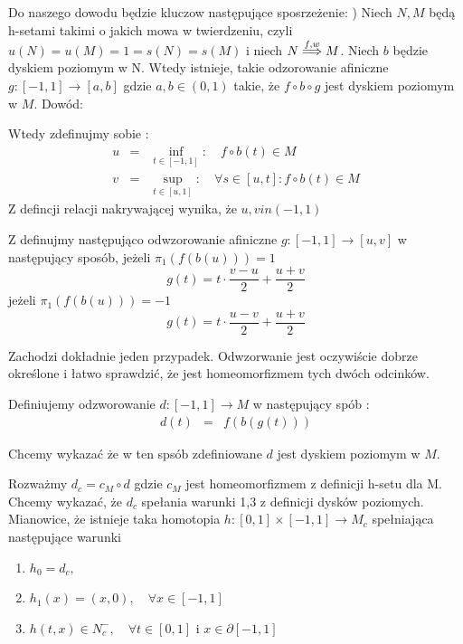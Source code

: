 Do naszego dowodu będzie kluczow następujące sposrzeżenie:
) Niech $N,M$ będą h-setami takimi o jakich mowa w twierdzeniu, czyli $ u(N)=u(M) = 1 = s(N) = s(M) $
i niech $ N \stackrel{f,w}{\Longrightarrow} M$. Niech $b$ będzie dyskiem poziomym w N.
Wtedy istnieje, takie odzorowanie afiniczne $ g:[-1,1] \to [a,b] $ gdzie $ a,b  \in (0,1) $ 
takie, że $ f \circ b \circ g $ jest dyskiem poziomym w $M$.
Dowód:

Wtedy zdefinujmy sobie :
\begin{eqnarray*}
  		u &=& \inf_{ t \in [-1,1]} : \quad f \circ b(t) \in M \\
  		v &=& \sup_{ t \in [u,1]} :  \quad \forall s \in [u,t] :  f \circ b(t) \in M
	\end{eqnarray*}
Z defincji relacji nakrywającej wynika, że $u,v in (-1,1)$

Z definujmy następująco odwzorowanie afiniczne $ g : [-1,1] \to [u,v] $ w następujący sposób, jeżeli
$ \pi_1(f(b(u))) = 1 $ 
\begin{equation}
      g(t) = t \cdot \frac{v-u}{2} + \frac{u+v}{2}
\end{equation}
jeżeli $\pi_1( f(b(u))) = -1 $ 
\begin{equation}
      g(t) = t \cdot \frac{u -v}{2} + \frac{u+v}{2}
\end{equation}


Zachodzi dokładnie jeden przypadek.
Odwzorwanie jest oczywiście dobrze określone i łatwo sprawdzić, że jest homeomorfizmem 
tych dwóch odcinków.

Definiujemy odzworowanie $d : [-1,1] \to M $ w następujący spób :
	\begin{eqnarray*}
  		d(t) &=& f(b(g(t)))
	\end{eqnarray*}

Chcemy wykazać że w ten spsób zdefiniowane $d$ jest dyskiem poziomym w $M$.

Rozważmy $d_c = c_M \circ d $ gdzie $c_M$ jest homeomorfizmem z definicji h-setu dla M.
Chcemy wykazać, że $d_c$ spełania warunki 1,3 z definicji dysków poziomych.
Mianowice, że istnieje taka homotopia $ h:[0,1]\times [-1,1] \to M_c $ spełniająca następujące warunki
\begin{enumerate}
    \item  $h_0 =d_c, $
    \item  $h_1(x) = (x,0),\quad \forall x \in [-1,1]$
    \item $h(t,x) \in N^-_c,\quad \forall t \in [0,1] \mbox{ i } x \in \partial [-1,1]$
\end{enumerate}

